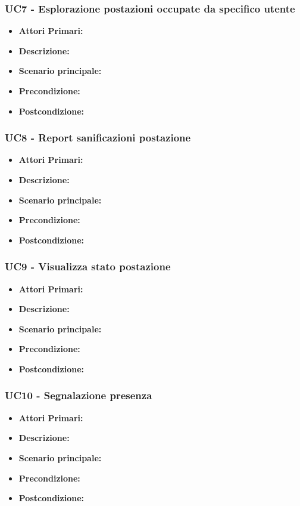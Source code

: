 \subsubsection{ UC7 - Esplorazione postazioni occupate da specifico utente}
\begin{itemize}
           	\item\textbf{Attori Primari:} 
           	\item\textbf{Descrizione:} 
           	\item\textbf{Scenario principale:} 
           	\item\textbf{Precondizione:} 
           	\item\textbf{Postcondizione:}
\end{itemize}

\subsubsection{ UC8 - Report sanificazioni postazione}
\begin{itemize}
           	\item\textbf{Attori Primari:} 
           	\item\textbf{Descrizione:} 
           	\item\textbf{Scenario principale:} 
           	\item\textbf{Precondizione:} 
           	\item\textbf{Postcondizione:}
\end{itemize}

\subsubsection{ UC9 - Visualizza stato postazione}
\begin{itemize}
           	\item\textbf{Attori Primari:} 
           	\item\textbf{Descrizione:} 
           	\item\textbf{Scenario principale:} 
           	\item\textbf{Precondizione:} 
           	\item\textbf{Postcondizione:}
\end{itemize}

\subsubsection{ UC10 - Segnalazione presenza}
\begin{itemize}
           	\item\textbf{Attori Primari:} 
           	\item\textbf{Descrizione:} 
           	\item\textbf{Scenario principale:} 
           	\item\textbf{Precondizione:} 
           	\item\textbf{Postcondizione:}
\end{itemize}

